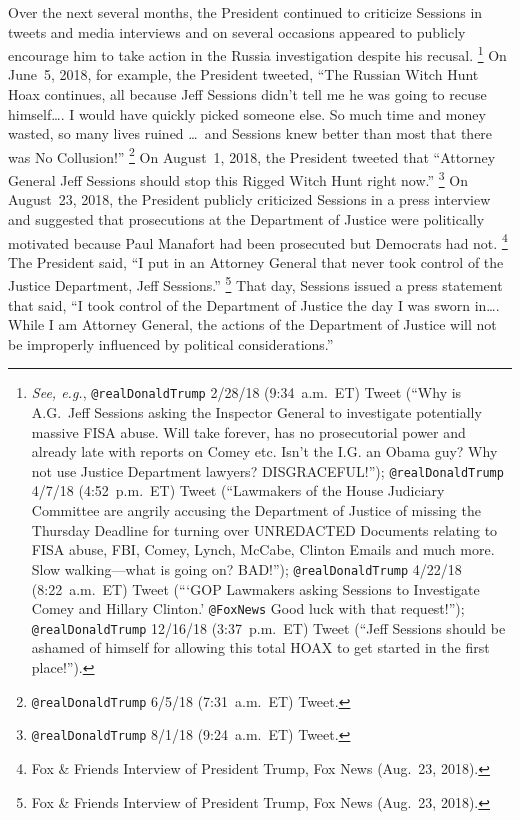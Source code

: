 Over the next several months, the President continued to criticize Sessions in tweets and media interviews and on several occasions appeared to publicly encourage him to take action in the Russia investigation despite his recusal.%
\footnote{\textit{See, e.g.}, \verb+@realDonaldTrump+ 2/28/18 (9:34~a.m.~ET) Tweet (``Why is A.G.~Jeff Sessions asking the Inspector General to investigate potentially massive FISA abuse.
Will take forever, has no prosecutorial power and already late with reports on Comey etc.
Isn't the I.G. an Obama guy?
Why not use Justice Department lawyers?
DISGRACEFUL!'');
\verb+@realDonaldTrump+ 4/7/18 (4:52~p.m.~ET) Tweet (``Lawmakers of the House Judiciary Committee are angrily accusing the Department of Justice of missing the Thursday Deadline for turning over UNREDACTED Documents relating to FISA abuse, FBI, Comey, Lynch, McCabe, Clinton Emails and much more.
Slow walking---what is going on? BAD!'');
\verb+@realDonaldTrump+ 4/22/18 (8:22~a.m.~ET) Tweet (``\thinspace`GOP Lawmakers asking Sessions to Investigate Comey and Hillary Clinton.' \verb+@FoxNews+ Good luck with that request!'');
\verb+@realDonaldTrump+ 12/16/18 (3:37~p.m.~ET) Tweet (``Jeff Sessions should be ashamed of himself for allowing this total HOAX to get started in the first place!'').}
On June~5, 2018, for example, the President tweeted, ``The Russian Witch Hunt Hoax continues, all because Jeff Sessions didn't tell me he was going to recuse himself\dots. I would have quickly picked someone else.
So much time and money wasted, so many lives ruined \dots\ and Sessions knew better than most that there was No Collusion!''%
\footnote{\verb+@realDonaldTrump+ 6/5/18 (7:31~a.m.~ET) Tweet.}
On August~1, 2018, the President tweeted that ``Attorney General Jeff Sessions should stop this Rigged Witch Hunt right now.''%
\footnote{\verb+@realDonaldTrump+ 8/1/18 (9:24~a.m.~ET) Tweet.}
On August~23, 2018, the President publicly criticized Sessions in a press interview and suggested that prosecutions at the Department of Justice were politically motivated because Paul Manafort had been prosecuted but Democrats had not.%
\footnote{Fox \& Friends Interview of President Trump, Fox News (Aug.~23, 2018).}
The President said, ``I put in an Attorney General that never took control of the Justice Department, Jeff Sessions.''%
\footnote{Fox \& Friends Interview of President Trump, Fox News (Aug.~23, 2018).}
That day, Sessions issued a press statement that said, ``I took control of the Department of Justice the day I was sworn in\dots.
While I am Attorney General, the actions of the Department of Justice will not be improperly influenced by political considerations.''%
